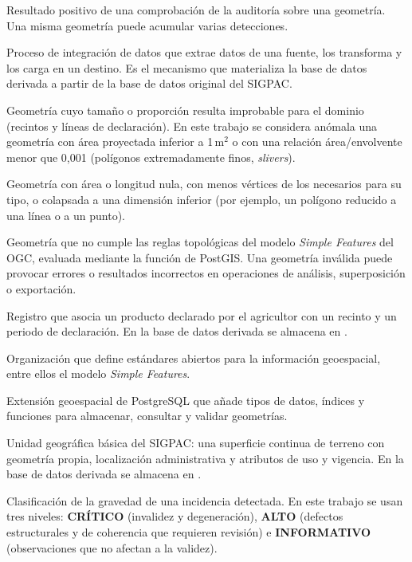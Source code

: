 \begin{description}[leftmargin=0pt, labelindent=0pt, labelsep=0pt, style=nextline, itemsep=0.9em, font=\normalfont\bfseries]
	 Resultado positivo de una comprobación de la auditoría sobre una geometría. Una misma geometría puede acumular varias detecciones.

	 Proceso de integración de datos que extrae datos de una fuente, los transforma y los carga en un destino. Es el mecanismo que materializa la base de datos derivada a partir de la base de datos original del SIGPAC.

	 Geometría cuyo tamaño o proporción resulta improbable para el dominio (recintos y líneas de declaración). En este trabajo se considera anómala una geometría con área proyectada inferior a 1\,m$^{2}$ o con una relación área/envolvente menor que 0,001 (polígonos extremadamente finos, \emph{slivers}).

	 Geometría con área o longitud nula, con menos vértices de los necesarios para su tipo, o colapsada a una dimensión inferior (por ejemplo, un polígono reducido a una línea o a un punto).

	 Geometría que no cumple las reglas topológicas del modelo \emph{Simple Features} del OGC, evaluada mediante la función  de PostGIS. Una geometría inválida puede provocar errores o resultados incorrectos en operaciones de análisis, superposición o exportación.

	 Registro que asocia un producto declarado por el agricultor con un recinto y un periodo de declaración. En la base de datos derivada se almacena en .

	 Organización que define estándares abiertos para la información geoespacial, entre ellos el modelo \emph{Simple Features}.

	 Extensión geoespacial de PostgreSQL que añade tipos de datos, índices y funciones para almacenar, consultar y validar geometrías.

	 Unidad geográfica básica del SIGPAC: una superficie continua de terreno con geometría propia, localización administrativa y atributos de uso y vigencia. En la base de datos derivada se almacena en .

	 Clasificación de la gravedad de una incidencia detectada. En este trabajo se usan tres niveles: \textbf{CRÍTICO} (invalidez y degeneración), \textbf{ALTO} (defectos estructurales y de coherencia que requieren revisión) e \textbf{INFORMATIVO} (observaciones que no afectan a la validez).


\end{description}
